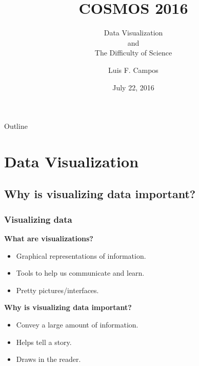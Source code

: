 \documentclass{beamer} %
\title[COSMOS 2016]{COSMOS 2016}
\subtitle{Data Visualization \\and \\The Difficulty of Science}
\author{Luis F. Campos}
\institute{Department of Statistics \\ Harvard University }
\date{July 22, 2016}
\newcommand{\1}{\mathbb{1}}
\begin{document}

\begin{frame}
	\titlepage	
\end{frame}
\begin{frame}{Outline}
  \tableofcontents
\end{frame}



\section[Data Visualization]{Data Visualization}

\subsection[Why is visualizing data important?]{Why is visualizing data important?}

\begin{frame}[t]\frametitle{Visualizing data}
\begin{center}
{\bf{What are visualizations?}}
\vspace{2 mm}
\begin{itemize}
	\item Graphical representations of information.
	\item Tools to help us communicate and learn.
	\item Pretty pictures/interfaces.
\end{itemize}
\end{center}
\vspace{5 mm}
\pause

\begin{center}
{\bf{Why is visualizing data important?}}
\vspace{2 mm}

\begin{itemize}
	\item Convey a large amount of information.
	\item Helps tell a story.
	\item Draws in the reader.
\end{itemize}
\end{center}

\end{frame}
\end{document}
